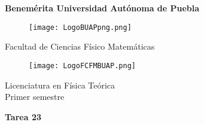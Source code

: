 \documentclass[12pt]{article}
\begin{document}
\begingroup
\begin{titlepage}
	\noindent
	\vspace{1mm}
\end{titlepage}
\endgroup

\pagestyle{empty} 
\setlength{\parindent}{0pt}
\sffamily


\begin{center} 

    \LARGE{\bf{\textsf{Benemérita Universidad Autónoma de Puebla}}} \\[0.5cm]
    
\begin{figure}[htb] \centering

    \texttt{[image: LogoBUAPpng.png]} 

\end{figure}


    \LARGE{Facultad de Ciencias Físico Matemáticas}\\[0.5cm]

\begin{figure}[htb] \centering

    \texttt{[image: LogoFCFMBUAP.png]} 
    
\end{figure} 


    \Large{Licenciatura en Física Teórica}\\[0.5cm]
    \Large{Primer semestre} 

\end{center} \vspace{0.3cm}

\begin{center}

    {\Large{\bfseries{{\textcolor{carrotorange}{Tarea 23}}}}} \\ 
    
\end{center}
\end{document}
